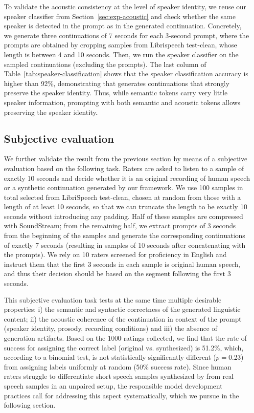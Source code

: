 \documentclass[letterpaper,10 pt]{IEEEtran}
\begin{document}
To validate the acoustic consistency at the level of speaker identity, we reuse our speaker classifier from Section~\ref{sec:exp-acoustic} and check whether the same speaker is detected in the prompt as in the generated continuation. Concretely, we generate three continuations of 7 seconds for each 3-second prompt, where the prompts are obtained by cropping samples from Librispeech test-clean, whose length is between 4 and 10 seconds. Then, we run the speaker classifier on the sampled continuations (excluding the prompts). The last column of Table~\ref{tab:speaker-classification} shows that the speaker classification accuracy is higher than 92\%, demonstrating that \ours{} generates continuations that strongly preserve the speaker identity. Thus, while semantic tokens carry very little speaker information, prompting \ours{} with both semantic and acoustic tokens allows preserving the speaker identity. 

\subsection{Subjective evaluation}\label{sec:subjective-eval}

We further validate the result from the previous section by means of a subjective evaluation based on the following task. Raters are asked to listen to a sample of exactly 10 seconds and decide whether it is an original recording of human speech or a synthetic continuation generated by our framework. We use 100 samples in total selected from LibriSpeech test-clean, chosen at random from those with a length of at least 10 seconds, so that we can truncate the length to be exactly 10 seconds without introducing any padding. Half of these samples are compressed with SoundStream; from the remaining half, we extract prompts of 3 seconds from the beginning of the samples and generate the corresponding continuations of exactly 7 seconds (resulting in samples of 10 seconds after concatenating with the prompts). We rely on 10 raters screened for proficiency in English and instruct them that the first 3 seconds in each sample is original human speech, and thus their decision should be based on the segment following the first 3 seconds.

This subjective evaluation task tests at the same time multiple desirable properties: i) the semantic and syntactic correctness of the generated linguistic content; ii) the acoustic coherence of the continuation in context of the prompt (speaker identity, prosody, recording conditions) and iii) the absence of generation artifacts. Based on the 1000 ratings collected, we find that the rate of success for assigning the correct label (original vs. synthesized) is 51.2\%, which, according to a binomial test, is not statistically significantly different ($p=0.23$) from assigning labels uniformly at random (50\% success rate). Since human raters struggle to differentiate short speech samples synthesized by \ours{} from real speech samples in an unpaired setup, the responsible model development practices call for addressing this aspect systematically, which we pursue in the following section. 
\end{document}
